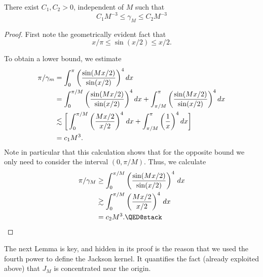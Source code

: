 \begin{lemma} \label{th:trig:gammaM_bound}
  There exist $C_1, C_2 > 0$, independent of $M$ such that
  \[
    C_1 M^{-3} \leq  \gamma_M \leq C_2 M^{-3}
  \]
\end{lemma}
\begin{proof}
  First note the geometrically evident fact that
  \[
    x/\pi \leq \sin(x/2) \leq x/2.
  \]

  To obtain a lower bound, we estimate 
  \begin{align*}
    \pi/\gamma_m &= \int_0^\pi \left( \frac{\sin( Mx/2)}{\sin(x/2)} \right)^4 dx \\
    &= \int_0^{\pi/M} \left( \frac{\sin( Mx/2)}{\sin(x/2)} \right)^4 dx  
        + \int_{\pi/M}^\pi \left( \frac{\sin( Mx/2)}{\sin(x/2)} \right)^4 dx  \\
    &\lesssim
        \bigg[ \int_0^{\pi/M} \left( \frac{Mx/2}{x/2} \right)^4 \, dx
        + \int_{\pi/M}^{\pi}
             \bigg( \frac{1}{x} \bigg)^4 \, dx \bigg] \\
    &= c_1 M^3.
  \end{align*}
  Note in particular that this calculation shows that for the opposite bound 
  we only need to consider the interval $(0, \pi/M)$. Thus, we calculate
  \begin{align*}
    \pi/\gamma_M
    &\geq \int_0^{\pi/M} \left( \frac{\sin( Mx/2)}{\sin(x/2)} \right)^4 \, dx \\
    &\gtrsim \int_0^{\pi/M} \left( \frac{Mx/2}{x/2} \right)^4 \, dx \\
    &=c_2 M^3. \qedhere
  \end{align*}
\end{proof}

The next Lemma is key, and hidden in its proof is the reason that we used the fourth power to define the Jackson kernel. It quantifies the fact (already exploited above) that $J_M$ is concentrated near the origin. 

